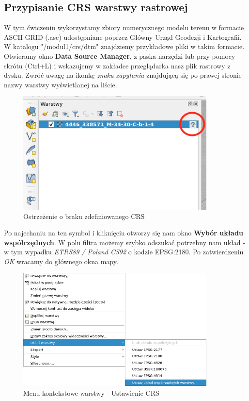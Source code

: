 \documentclass[a4paper,11pt, onecolumn, openany]{memoir}
\begin{document}
		\subsection{Przypisanie CRS warstwy rastrowej}
		W tym ćwiczeniu wykorzystamy zbiory numerycznego modelu terenu w formacie ASCII GRID (.asc) udostępniane poprzez Główny Urząd Geodezji i Kartografii.
		W katalogu "/modul1/crs/dtm" znajdziemy przykładowe pliki w takim formacie. Otwieramy okno \textbf{Data Source Manager}, z paska narzędzi lub przy pomocy skrótu (Ctrl+L) i wskazujemy w zakładce przeglądarka nasz plik rastrowy z dysku.
		Zwróć uwagę na ikonkę \emph{znaku zapytania} znajdującą się po prawej stronie nazwy warstwy wyświetlanej na liście.
		\begin{figure}[!ht]
			\centering
			\includegraphics[width=10cm]{crs-cwiczenie1-brak-crs}
			\caption{Ostrzeżenie o braku zdefiniowanego CRS}
		\end{figure}
	Po najechaniu na ten symbol i kliknięciu otworzy się nam okno \textbf{Wybór układu współrzędnych}. W polu filtra możemy szybko odszukać potrzebny nam układ - w tym wypadku \emph{ETRS89 / Poland CS92} o kodzie EPSG:2180. Po zatwierdzeniu \emph{OK} wracamy do głównego okna mapy.
	\begin{figure}[!ht]
    	\centering
	    \includegraphics[width=10cm]{crs-cwiczenie1-menu-kontekstowe}
    	\caption{Menu kontekstowe warstwy - Ustawienie CRS}
    \end{figure}
\end{document}
